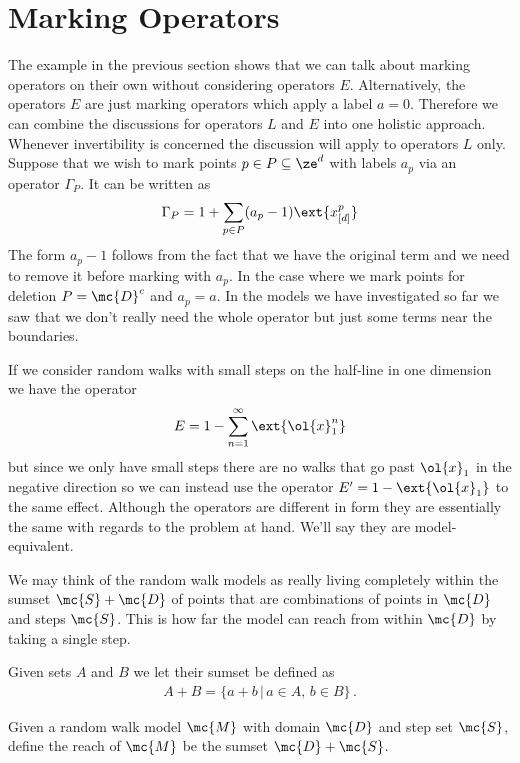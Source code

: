 \section{Marking Operators}
The example in the previous section shows that we can talk about marking operators on their own without considering operators $E$. Alternatively, the operators $E$ are just marking operators which apply a label $a = 0$. Therefore we can combine the discussions for operators $L$ and $E$ into one holistic approach. Whenever invertibility is concerned the discussion will apply to operators $L$ only. Suppose that we wish to mark points $p \in P\subseteq \ze^d$ with labels $a_p$ via an operator $\Gamma_P$. It can be written as
\begin{align}
	\Gamma_P = 1 + \sum_{p\in P}(a_p-1) \ext{x_{[d]}^p}
\end{align}
The form $a_p-1$ follows from the fact that we have the original term and we need to remove it before marking with $a_p$. In the case where we mark points for deletion $P = {\mc{D}}^c$ and $a_p = a$. In the models we have investigated so far we saw that we don't really need the whole operator but just some terms near the boundaries.
\begin{example} If we consider random walks with small steps on the half-line in one dimension we have the operator
\begin{align}
	E = 1 - \sum_{n=1}^\infty \ext{\ol{x}_1^n}
\end{align}
but since we only have small steps there are no walks that go past $\ol{x}_1$ in the negative direction so we can instead use the operator $E' = 1- \ext{\ol{x}_1}$ to the same effect. Although the operators are different in form they are essentially the same with regards to the problem at hand. We'll say they are model-equivalent.
\end{example}
We may think of the random walk models as really living completely within the sumset $\mc{S}+\mc{D}$ of points that are combinations of points in $\mc{D}$ and steps $\mc{S}$. This is how far the model can reach from within $\mc{D}$ by taking a single step.
\begin{definition} Given sets $A$ and $B$ we let their sumset be defined as
\begin{align}
	A+ B = \{a+b\,|\,a\in A,\, b\in B\}\,.
\end{align}
\end{definition}
\begin{definition} Given a random walk model $\mc{M}$ with domain $\mc{D}$ and step set $\mc{S}$, define the reach of $\mc{M}$ be the sumset $\mc{D}+\mc{S}$.
\end{definition}
